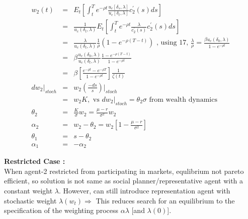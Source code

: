 \documentclass[]{article}
\begin{document}
\begin{eqnarray*}
w_2(t) &=& E_t\left[\int_t^T e^{-\rho t} \frac{u_c[\delta_s, \lambda]}{u_c[\delta_t,\lambda]} c_2^\prime(s)ds\right]\\
&=& \frac{1}{u_c(\delta_t,\lambda)} E_t\left[\int_t^T e^{-\rho t} \frac{\lambda}{c_2^\prime(s)} c_2^\prime(s)ds\right]\\
&=& \frac{\lambda}{u_c(\delta_t,\lambda)} \frac{1}{\rho} \left(1-e^{-\rho(T-t)}\right) \mbox{ , using 17, } \frac{\lambda}{\rho} = \frac{\beta u_c(\delta_0,\lambda)}{1-e^{-\rho t}}\\
&=& \beta \frac{u_c(\delta_0,\lambda)}{u_c(\delta_t, \lambda)} \frac{1-e^{-\rho(T-t)}}{1-e^{-\rho t}}\\
&=& \beta \left[\frac{e^{-\rho t} - e^{-\rho T}}{1-e^{-\rho t}}\right]\frac{1}{\zeta(t)}\\
dw_2|_{stoch} &=& w_2 \left(\frac{-ds}{s}\right)|_{stoch}\\
&=& w_2K, \mbox{    vs }dw_2|_{stoch}=\theta_2 \sigma \mbox{ from wealth dynamics}\\
\theta_2 &=& \frac{K}{\sigma}w_2 = \frac{\mu -r}{\sigma^2}w_2\\
\alpha_2 &=& w_2 - \theta_2 = w_2\left[1-\frac{\mu -r}{\sigma^2}\right]\\
\theta_1 &=& s-\theta_2\\
\alpha_1 &=& -\alpha_2
\end{eqnarray*}

\textbf{Restricted Case : }\\
When agent-2 restricted from participating in markets, equlibrium not pareto efficient, so solution is not same as social planner/representative agent with a constant weight $\lambda $. However, can still introduce representation agent with stochastic weight $\lambda(w_t) \Rightarrow$ This reduces search for an equilibrium to the specification of the weighting process $\alpha \lambda $ [and $\lambda(0)$].\\
\end{document}
